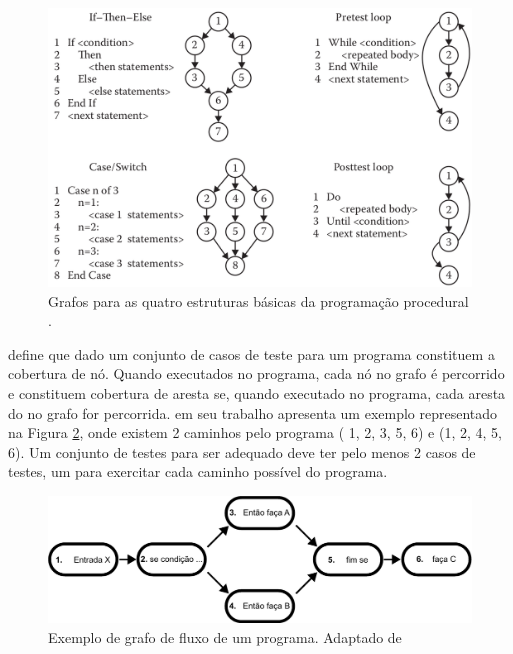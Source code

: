 \begin{figure}[ht]
\centering
\includegraphics[scale=0.3]{imagens/const_basica_grafo.png}
\caption{Grafos para as quatro estruturas básicas da programação procedural \cite{jorgensen2016software}.}
\label{fig:4estrutura_basica}
\end{figure}

\cite{jorgensen2016software} define que dado um conjunto de casos de teste para um programa constituem a cobertura de nó. Quando executados no programa, cada nó no grafo é percorrido e constituem cobertura de aresta se, quando executado no programa, cada aresta do no grafo for percorrida. \cite{winikoff2014testability} em seu trabalho apresenta um exemplo representado na Figura \ref{fig:exemplo_grafo}, onde existem 2 caminhos pelo programa ( 1, 2, 3, 5, 6) e (1, 2, 4, 5, 6). Um conjunto de testes para ser adequado deve ter pelo menos 2 casos de testes, um para exercitar cada caminho possível do programa.

\begin{figure}[ht]
\centering
\includegraphics[scale=0.7]{imagens/exemplo_grafo.pdf}
\caption{Exemplo de grafo de fluxo de um programa. Adaptado de \cite{winikoff2014testability}}
\label{fig:exemplo_grafo}
\end{figure}


